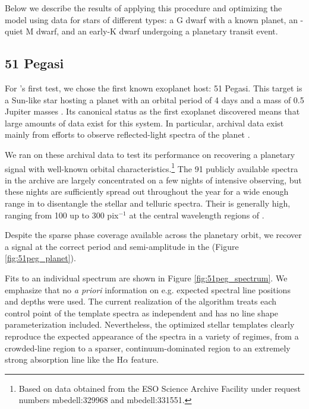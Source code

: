 \documentclass[modern]{aastex62}
\begin{document}
Below we describe the results of applying this procedure and optimizing the \wobble model using \HARPS data for stars of different types: a G dwarf with a known planet, an \RV-quiet M dwarf, and an early-K dwarf undergoing a planetary transit event.

\subsection{51 Pegasi}

For \wobble's first test, we chose the first known exoplanet host: 51 Pegasi. 
This target is a Sun-like star hosting a planet with an orbital period of 4 days and a mass of 0.5 Jupiter masses \citep{Mayor1995}. 
Its canonical status as the first exoplanet discovered means that large amounts of data exist for this system. 
In particular, archival \HARPS data exist mainly from efforts to observe reflected-light spectra of the planet \citep{Martins2015}. 

We ran \wobble on these archival data to test its performance on recovering a planetary signal with well-known orbital characteristics.\footnote{Based on data obtained from the ESO Science Archive Facility under request numbers mbedell:329968 and mbedell:331551.} 
The 91 publicly available spectra in the \HARPS archive are largely concentrated on a few nights of intensive observing, but these nights are sufficiently spread out throughout the year for a wide enough range in \BERV to disentangle the stellar and telluric spectra. 
Their \SNR is generally high, ranging from 100 up to 300 pix$^{-1}$ at the central wavelength regions of \HARPS.

Despite the sparse phase coverage available across the planetary orbit, we recover a signal at the correct period and semi-amplitude in the \RVs (Figure \ref{fig:51peg_planet}). 

Fits to an individual spectrum are shown in Figure \ref{fig:51peg_spectrum}. 
We emphasize that no \textit{a priori} information on e.g. expected spectral line positions and depths were used. 
The current realization of the \wobble algorithm treats each control point of the template spectra as independent and has no line shape parameterization included. 
Nevertheless, the optimized stellar templates clearly reproduce the expected appearance of the spectra in a variety of regimes, from a crowded-line region to a sparser, continuum-dominated region to an extremely strong absorption line like the H$\alpha$ feature.
\end{document}
